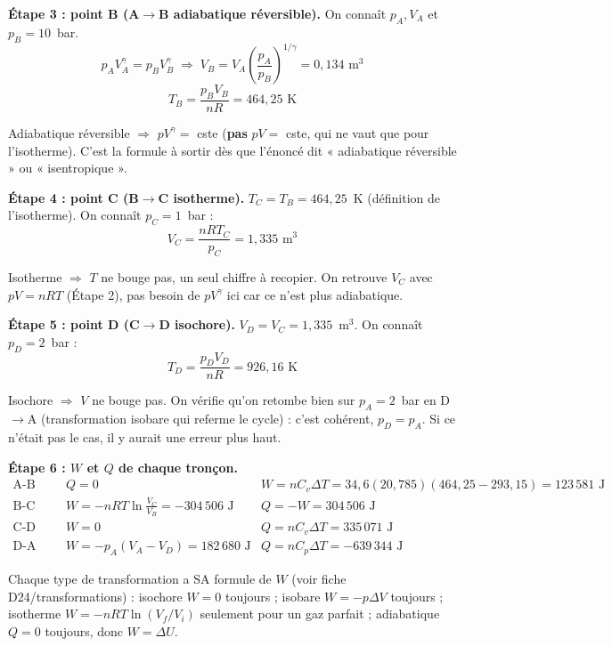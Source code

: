 \documentclass[11pt,a4paper]{article}
\begin{document}
\begin{calc}
\textbf{Étape 3 : point B (A$\to$B adiabatique réversible).} On connaît $p_A,V_A$ et $p_B=10$~bar.
\[ p_AV_A^\gamma = p_BV_B^\gamma \;\Rightarrow\; V_B = V_A\left(\frac{p_A}{p_B}\right)^{1/\gamma}
= 0{,}134\text{ m}^3 \]
\[ T_B = \frac{p_BV_B}{nR} = 464{,}25\text{ K} \]
\end{calc}
\begin{pourquoi}
Adiabatique réversible $\Rightarrow$ $pV^\gamma=$ cste (\textbf{pas} $pV=$ cste, qui ne vaut que pour
l'isotherme). C'est la formule à sortir dès que l'énoncé dit « adiabatique réversible » ou
« isentropique ».
\end{pourquoi}

\begin{calc}
\textbf{Étape 4 : point C (B$\to$C isotherme).} $T_C=T_B=464{,}25$~K (définition de l'isotherme).
On connaît $p_C=1$~bar :
\[ V_C = \frac{nRT_C}{p_C} = 1{,}335\text{ m}^3 \]
\end{calc}
\begin{pourquoi}
Isotherme $\Rightarrow$ $T$ ne bouge pas, un seul chiffre à recopier. On retrouve $V_C$ avec
$pV=nRT$ (Étape 2), pas besoin de $pV^\gamma$ ici car ce n'est plus adiabatique.
\end{pourquoi}

\begin{calc}
\textbf{Étape 5 : point D (C$\to$D isochore).} $V_D=V_C=1{,}335$~m$^3$. On connaît $p_D=2$~bar :
\[ T_D = \frac{p_DV_D}{nR} = 926{,}16\text{ K} \]
\end{calc}
\begin{pourquoi}
Isochore $\Rightarrow$ $V$ ne bouge pas. On vérifie qu'on retombe bien sur $p_A=2$~bar en D$\to$A
(transformation isobare qui referme le cycle) : c'est cohérent, $p_D=p_A$. Si ce n'était pas le cas,
il y aurait une erreur plus haut.
\end{pourquoi}

\begin{calc}
\textbf{Étape 6 : $W$ et $Q$ de chaque tronçon.}
\[
\begin{array}{lll}
\text{A-B (adiab.)} & Q=0 & W=nC_v\Delta T = 34{,}6(20{,}785)(464{,}25-293{,}15)=123\,581\text{ J}\\
\text{B-C (isoth.)} & W=-nRT\ln\!\frac{V_C}{V_B}=-304\,506\text{ J} & Q=-W=304\,506\text{ J}\\
\text{C-D (isoch.)} & W=0 & Q=nC_v\Delta T = 335\,071\text{ J}\\
\text{D-A (isob.)} & W=-p_A(V_A-V_D)=182\,680\text{ J} & Q=nC_p\Delta T = -639\,344\text{ J}
\end{array}
\]
\end{calc}
\begin{pourquoi}
Chaque type de transformation a SA formule de $W$ (voir fiche D24/transformations) : isochore
$W{=}0$ toujours ; isobare $W{=}-p\Delta V$ toujours ; isotherme $W{=}-nRT\ln(V_f/V_i)$ seulement pour
un gaz parfait ; adiabatique $Q{=}0$ toujours, donc $W{=}\Delta U$.
\end{pourquoi}
\end{document}
